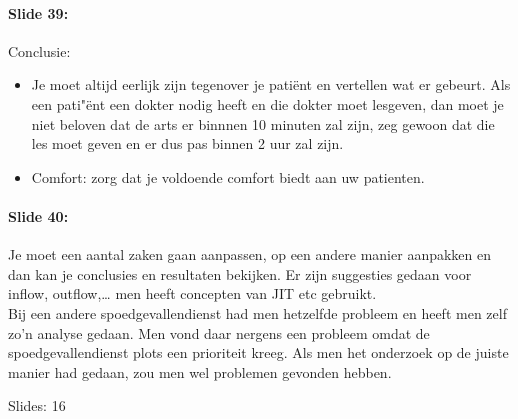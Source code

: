 \documentclass[10pt,a4paper]{report}
\begin{document}
\paragraph{Slide 39:} Conclusie: 
\begin{itemize}
\item Je moet altijd eerlijk zijn tegenover je pati\"ent en vertellen wat er gebeurt. Als een pati"\"ent een dokter nodig heeft en die dokter moet lesgeven, dan moet je niet beloven dat de arts er binnnen 10 minuten zal zijn, zeg gewoon dat die les moet geven en er dus pas binnen 2 uur zal zijn. 
\item Comfort: zorg dat je voldoende comfort biedt aan uw patienten.
\end{itemize}

\paragraph{Slide 40:} Je moet een aantal zaken gaan aanpassen, op een andere manier aanpakken en dan kan je conclusies en resultaten bekijken. Er zijn suggesties gedaan voor inflow, outflow,… men heeft concepten van JIT etc gebruikt.\\
Bij een andere spoedgevallendienst had men hetzelfde probleem en heeft men zelf zo'n analyse gedaan. Men vond daar nergens een probleem omdat de spoedgevallendienst plots een prioriteit kreeg. Als men het onderzoek op de juiste manier had gedaan, zou men wel problemen gevonden hebben.


Slides: 16
\end{document}
